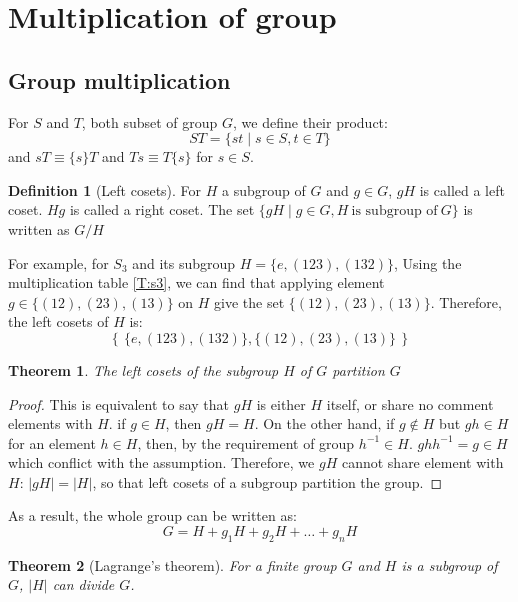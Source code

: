 \documentclass{amsart}
\newtheorem*{theorem}{Theorem}
\theoremstyle{remark}
\theoremstyle{remark}
\theoremstyle{definition}
\newtheorem*{definition}{Definition}
\begin{document}
\section*{Multiplication of group} 

\subsection*{Group multiplication}
For $S$ and $T$, both subset of group $G$, we define their product:
\begin{equation*}
    ST = \{st\mid s\in S, t \in T\}
\end{equation*}
and $sT \equiv \{s\}T $ and $Ts \equiv T\{s\} $ for $s \in S$.

\vspace{10pt}

\begin{definition}[Left cosets]
    For $H$ a subgroup of $G$ and $g \in G$, $gH$ is called a left coset. $Hg$ is called a right coset. 
    The set $\{gH \mid g \in G, H\ \text{is subgroup of}\ G\}$ is written as $G/H$
\end{definition}

For example, for $S_3$ and its subgroup $H = \{e,(123),(132)\}$, 
Using the multiplication table \ref{T:s3}, we can find that
applying element $g \in \{(12), (23), (13)\}$ on $H$
give the set $\{(12), (23), (13)\}$. Therefore, the left cosets of $H$ is:
\[
    \left\{\, \{e,(123),(132)\}, \{(12), (23), (13)\}\, \right\}    
\]

\begin{theorem}
    The left cosets of the subgroup $H$ of $G$ partition $G$
\end{theorem}
\begin{proof}
    This is equivalent to say that $gH$ is either $H$ itself, or share no comment elements with $H$.
    if $g\in H$, then $gH = H$. On the other hand, 
    if $g\notin H$ but $gh \in H$ for an element $h\in H$, then, by the requirement of group $h^{-1}\in H$. $ghh^{-1} = g \in H$ which conflict with the assumption.
    Therefore, we $gH$ cannot share element with $H$: $|gH| = |H|$, so that left cosets of a subgroup partition the group.
\end{proof}
As a result, the whole group can be written as:
\[
    G = H + g_1 H + g_2 H + \dots + g_n H    
\]
\begin{theorem}[Lagrange's theorem]
    For a finite group $G$ and $H$ is a subgroup of $G$, $|H|$ can divide $G$.
\end{theorem}
\end{document}
